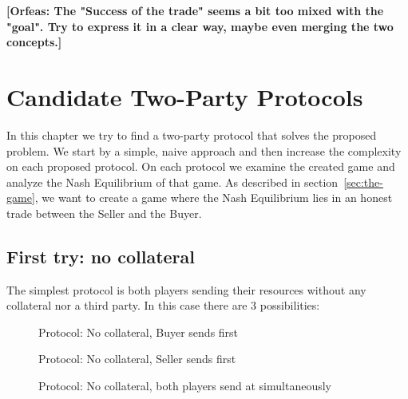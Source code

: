 \documentclass{cacthesis}
\newcommand{\authnote}[3]{{ \footnotesize \textbf{#1[#2: #3]~}}}
\newcommand{\orfnote}[1]{\authnote{\color{blue}}{Orfeas}{#1}}
\begin{document}
\orfnote{The "Success of the trade" seems a bit too mixed with the "goal". Try
to express it in a clear way, maybe even merging the two concepts.}


\chapter{Candidate Two-Party Protocols}
In this chapter we try to find a two-party protocol that solves the proposed problem. We start by a simple, naive approach and then increase the complexity on each proposed protocol. On each protocol we examine the created game and analyze the Nash Equilibrium of that game. As described in section~\ref{sec:the-game}, we want to create a game where the Nash Equilibrium lies in an honest trade between the Seller and the Buyer.

\section{First try: no collateral}
\label{sec:first-try-nocol}
The simplest protocol is both players sending their resources without any collateral nor a third party. In this case there are 3 possibilities:
\begin{figure}[htb!]
    \centering
    \caption{Protocol: No collateral, Buyer sends first}
    \label{pro:naive-buyer-first}
\end{figure}

\begin{figure}[htb!]
    \centering
    \caption{Protocol: No collateral, Seller sends first}
    \label{pro:naive-seller-first}
\end{figure}

\begin{figure}[htb!]
    \centering
    \caption{Protocol: No collateral, both players send at simultaneously}
    \label{pro:naive-simultaneous}
\end{figure}
\end{document}
